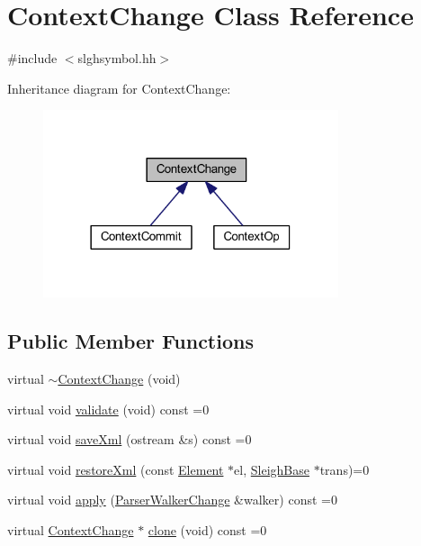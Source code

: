 \hypertarget{class_context_change}{}\section{Context\+Change Class Reference}
\label{class_context_change}


{\ttfamily \#include $<$slghsymbol.\+hh$>$}



Inheritance diagram for Context\+Change\+:
\nopagebreak
\begin{figure}[H]
\begin{center}
\leavevmode
\includegraphics[width=246pt]{class_context_change__inherit__graph}
\end{center}
\end{figure}
\subsection*{Public Member Functions}
\begin{DoxyCompactItemize}
\item 
virtual \mbox{\hyperlink{class_context_change_a5d37d43a00630e1a3fe8326eede053bc}{$\sim$\+Context\+Change}} (void)
\item 
virtual void \mbox{\hyperlink{class_context_change_a9a9263347e16d2e396e3963a43eb7ea8}{validate}} (void) const =0
\item 
virtual void \mbox{\hyperlink{class_context_change_a9874429eee192c35909a130dfdbbc83d}{save\+Xml}} (ostream \&s) const =0
\item 
virtual void \mbox{\hyperlink{class_context_change_a95a77fd92582d479472c46e672262248}{restore\+Xml}} (const \mbox{\hyperlink{class_element}{Element}} $\ast$el, \mbox{\hyperlink{class_sleigh_base}{Sleigh\+Base}} $\ast$trans)=0
\item 
virtual void \mbox{\hyperlink{class_context_change_a969bb7f403bf3a60f1fff0948ba84eeb}{apply}} (\mbox{\hyperlink{class_parser_walker_change}{Parser\+Walker\+Change}} \&walker) const =0
\item 
virtual \mbox{\hyperlink{class_context_change}{Context\+Change}} $\ast$ \mbox{\hyperlink{class_context_change_ab1e858b15bc17c5dc375d5cda51dfeea}{clone}} (void) const =0
\end{DoxyCompactItemize}


